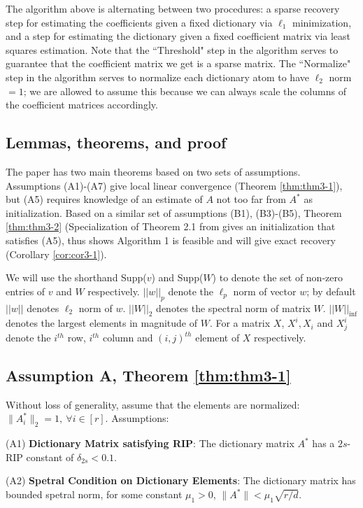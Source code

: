 The algorithm above is alternating between two procedures: a sparse recovery step for estimating the coefficients given a fixed dictionary via $\ell_1$ minimization, and a step for estimating the dictionary given a fixed coefficient matrix via least squares estimation. Note that the ``Threshold" step in the algorithm serves to guarantee that the coefficient matrix we get is a sparse matrix. The ``Normalize" step in the algorithm serves to normalize each dictionary atom to have $\ell_2$ norm $=1$; we are allowed to assume this because we can always scale the columns of the coefficient matrices accordingly. 


\subsection{Lemmas, theorems, and proof}
The paper has two main theorems based on two sets of assumptions. Assumptions (A1)-(A7) give local linear convergence (Theorem \ref{thm:thm3-1}), but (A5) requires knowledge of an estimate of $A$ not too far from $A^*$ as initialization. Based on a similar set of assumptions (B1), (B3)-(B5), Theorem \ref{thm:thm3-2} (Specialization of Theorem 2.1 from \cite{ref1} gives an initialization that satisfies (A5), thus shows Algorithm 1 is feasible and will give exact recovery (Corollary \ref{cor:cor3-1}).

We will use the shorthand Supp($v$) and Supp($W$) to denote the set of non-zero entries of $v$ and $W$ respectively. $||w||_p$ denote the $\ell_p$ norm of vector $w$; by default $||w||$ denotes $\ell_2$ norm of $w$. $||W||_2$ denotes the spectral norm of matrix $W$. $||W||_{\inf}$ denotes the largest elements in magnitude of $W$. For a matrix $X$, $X^i, X_i$ and $X_j^i$ denote the $i^{th}$ row, $i^{th}$ column and $(i, j)^{th}$ element of $X$ respectively. 

\subsection{Assumption A, Theorem \ref{thm:thm3-1}}
Without loss of generality, assume that the elements are normalized: $\lVert A_i^* \rVert_2=1,~\forall i\in[r]$.
Assumptions:

(A1) \textbf{Dictionary Matrix satisfying RIP}: The dictionary matrix $A^*$ has a $2s$-RIP constant of $\delta_{2s}<0.1$.

(A2) \textbf{Spetral Condition on Dictionary Elements}: The dictionary matrix has bounded spetral norm, for some constant $\mu_1>0$, $\lVert A^*\rVert<\mu_1\sqrt{r/d}$.

